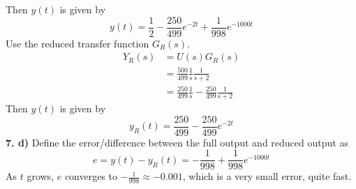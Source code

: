 \documentclass[11pt, a4paper]{article}
\begin{document}
Then $y(t)$ is given by
\begin{equation*}
y(t) = \frac{1}{2} - \frac{250}{499}e^{-2t} + \frac{1}{998}e^{-1000t}
\end{equation*}
Use the reduced transfer function $G_R(s)$. 
\begin{equation*}
\begin{split}
Y_R(s) &= U(s)G_R(s) \\
     &= \frac{500}{499}\frac{1}{s}\frac{1}{s+2} \\
     &= \frac{250}{499}\frac{1}{s} - \frac{250}{499}\frac{1}{s+2}
\end{split}
\end{equation*}
Then $y(t)$ is given by
\begin{equation*}
y_R(t) = \frac{250}{499} - \frac{250}{499}e^{-2t}
\end{equation*}
\textbf{7. d)} Define the error/difference between the full output and reduced output as
\begin{equation*}
e = y(t) - y_R(t) = -\frac{1}{998} + \frac{1}{998}e^{-1000t}
\end{equation*}
As $t$ grows, $e$ converges to $-\frac{1}{998} \approx -0.001$, which is a very small error, quite fast.
\end{document}
